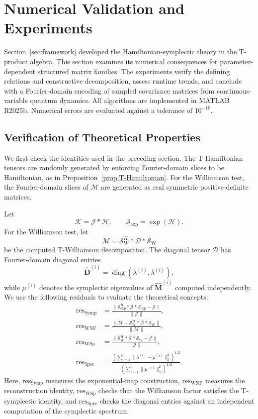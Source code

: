 \documentclass[pdflatex,sn-mathphys-ay]{sn-jnl}
\newcommand{\T}[1]{\mathcal{#1}}    %
\newcommand{\M}[1]{\bm{#1}}     %
\theoremstyle{thmstyleone}
\theoremstyle{thmstyletwo}
\theoremstyle{thmstylethree}
\numberwithin{equation}{section}
\begin{document}
\section{Numerical Validation and Experiments}
\label{sec:application}

Section~\ref{sec:framework} developed the Hamiltonian-symplectic theory in the T-product algebra. 
This section examines its numerical consequences for parameter-dependent structured matrix families. 
The experiments verify the defining relations and constructive decomposition, assess runtime trends, and conclude with a Fourier-domain encoding of sampled covariance matrices from continuous-variable quantum dynamics.
All algorithms are implemented in MATLAB R2025b. 
Numerical errors are evaluated against a tolerance of $10^{-10}$.

\subsection{Verification of Theoretical Properties}

We first check the identities used in the preceding section. 
The T-Hamiltonian tensors are randomly generated by
enforcing Fourier-domain slices to be Hamiltonian,
as in Proposition~\ref{prop:T-Hamiltonian}. 
For the Williamson test, the Fourier-domain slices of $\T{M}$ are generated as real symmetric positive-definite matrices.

Let
\[
\T{K}=\T{J}*\T{H},\qquad
\T{S}_{\exp}=\exp(\T{H}).
\]
For the Williamson test, let
\[
\T{M}=\T{S}_{\mathrm{W}}^H*\T{D}*\T{S}_{\mathrm{W}}
\]
be the computed T-Williamson decomposition. The diagonal tensor $\T{D}$ has Fourier-domain diagonal entries
\[
\widehat{\M{D}}^{(i)}
=
\operatorname{diag}(\lambda^{(i)},\lambda^{(i)}),
\]
while $\mu^{(i)}$ denotes the symplectic eigenvalues of
$\widehat{\M{M}}^{(i)}$ computed independently. 
We use the following residuals to evaluate the theoretical concepts:
\begin{align*}
\mathrm{res}_{\mathrm{Symp}}
&=
\frac{\|\T{S}_{\exp}^H*\T{J}*\T{S}_{\exp}-\T{J}\|}
{\|\T{J}\|},\\
\mathrm{res}_{\mathrm{WNF}}
&=
\frac{\|\T{M}-\T{S}_{\mathrm{W}}^H*\T{D}*\T{S}_{\mathrm{W}}\|}
{\|\T{M}\|},\\
\mathrm{res}_{\mathrm{WSp}}
&=
\frac{\|\T{S}_{\mathrm{W}}^H*\T{J}*\T{S}_{\mathrm{W}}-\T{J}\|}
{\|\T{J}\|},\\
\mathrm{res}_{\mathrm{Spec}}
&=
\frac{
\left(\sum_{i=1}^{p}
\|\lambda^{(i)}-\mu^{(i)}\|_2^2
\right)^{1/2}}
{
\left(\sum_{i=1}^{p}
\|\mu^{(i)}\|_2^2
\right)^{1/2}}.
\end{align*}
Here, $\mathrm{res}_{\mathrm{Symp}}$ measures the exponential-map construction, $\mathrm{res}_{\mathrm{WNF}}$ measures the reconstruction identity, $\mathrm{res}_{\mathrm{WSp}}$ checks that the Williamson factor satisfies the T-symplectic identity, and $\mathrm{res}_{\mathrm{Spec}}$ checks the diagonal entries against an independent computation of the symplectic spectrum.
\end{document}
